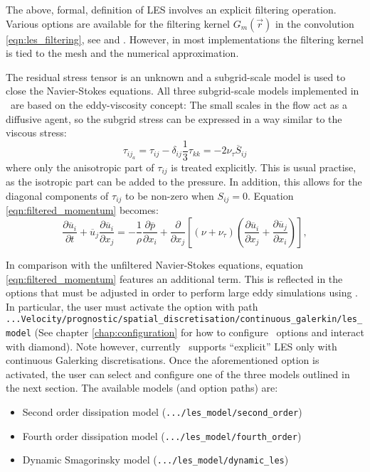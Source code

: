 The above, formal, definition of LES involves an explicit filtering operation. Various options are available
for the filtering kernel $G_m\left( \overrightarrow{r} \right)$ in the convolution \eqref{eqn:les_filtering},
see \cite{pope2000} and \cite{sagaut1998}. However, in most implementations the filtering kernel is tied
to the mesh and the numerical approximation.%
\par
The residual stress tensor is an unknown and a subgrid-scale model is used to close the Navier-Stokes
equations. All three subgrid-scale models implemented in \fluidity\ are based on the eddy-viscosity concept: The small scales in the flow act as a diffusive agent, so the subgrid stress can be expressed in a way
similar to the viscous stress:
\begin{equation}
\tau_{{ij}_a} = \tau_{ij} - \delta_{ij} \frac 1 3 \tau_{kk} = -2 \nu_\tau \overline{S}_{ij}
\label{eqn:eddy_viscosity_concept} 
\end{equation}
where only the anisotropic part of $\tau_{ij}$ is treated explicitly. This is usual practise, as the isotropic
part can be added to the pressure. In addition, this allows for the diagonal components of $\tau_{ij}$
to be non-zero when $S_{ij}=0$. Equation \eqref{eqn:filtered_momentum} becomes:
\begin{equation}
\frac{\partial \overline{u}_i}{\partial t} + \overline{u}_j \frac{\partial \overline{u}_i}{\partial x_j}
 = -\frac 1 \rho \frac{\partial \overline{p}}{\partial x_i}
 + \frac{\partial}{\partial x_j} \left [ (\nu + \nu_\tau) \left ( \frac{\partial \overline{u}_i}{\partial x_j} + \frac{\partial \overline{u}_j}{\partial x_i} \right ) \right ],
\end{equation}
\par
In comparison with the unfiltered Navier-Stokes equations, equation \eqref{eqn:filtered_momentum}
features an additional term. This is reflected in the options that must be adjusted in order to
perform large eddy simulations using \fluidity. In particular, the user must activate the option
with path \lstinline+...Velocity/prognostic/spatial_discretisation/continuous_galerkin/les_model+
(See chapter \ref{chap:configuration} for how to configure \fluidity\ options and interact with diamond).
Note however, currently \fluidity\ supports ``explicit'' LES only with continuous Galerking discretisations.
Once the aforementioned option is activated, the user can select and configure one of the three models
outlined in the next section. The available models (and option paths) are:
\begin{itemize}
  \item Second order dissipation model (\lstinline+.../les_model/second_order+)
  \item Fourth order dissipation model (\lstinline+.../les_model/fourth_order+)
  \item Dynamic Smagorinsky model (\lstinline+.../les_model/dynamic_les+)
\end{itemize}

